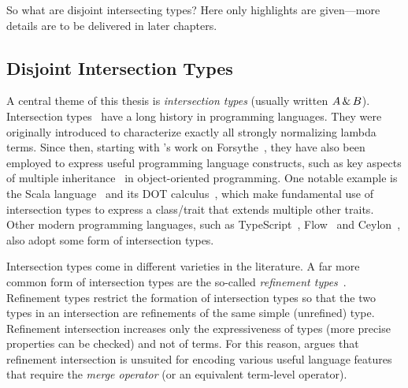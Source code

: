 So what are disjoint intersecting types? Here only highlights are given---more
details are to be delivered in later chapters.

\subsection{Disjoint Intersection Types}

A central theme of this thesis is \textit{intersection types} (usually written
$A \,\&\, B$). Intersection types~\citep{pottinger1980type, coppoInter} have a
long history in programming languages. They were originally introduced to
characterize exactly all strongly normalizing lambda terms. Since then, starting
with \citeauthor{reynolds1988preliminary}'s work on
Forsythe~\citep{reynolds1988preliminary}, they have also been employed to
express useful programming language constructs, such as key aspects of multiple
inheritance~\citep{compagnoni1996higher} in object-oriented programming. One
notable example is the Scala language~\citep{odersky2004overview} and its DOT
calculus~\citep{amin2012dependent}, which make fundamental use of intersection
types to express a class/trait that extends multiple other traits. Other modern
programming languages, such as TypeScript~\citep{typescript}, Flow~\citep{flow}
and Ceylon~\citep{ceylon}, also adopt some form of intersection types.

Intersection types come in different varieties in the literature. A far more
common form of intersection types are the so-called \emph{refinement
  types}~\citep{Freeman_1991, Davies_2000, dunfield2003type}. Refinement types
restrict the formation of intersection types so that the two types in an
intersection are refinements of the same simple (unrefined) type.
Refinement intersection increases only the expressiveness of types (more precise
properties can be checked) and not of terms. For this reason,
\citet{dunfield2014elaborating} argues that refinement intersection is unsuited
for encoding various useful language features that require the \textit{merge operator}
(or an equivalent term-level operator).

